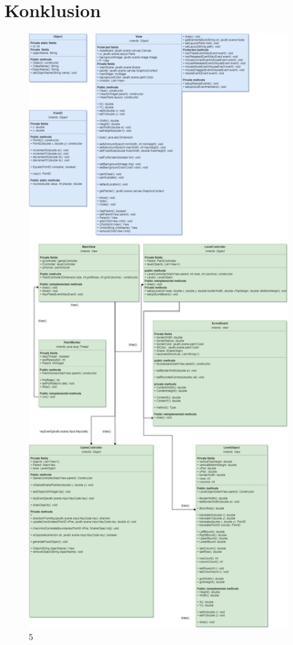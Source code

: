 \documentclass[]{article}
\begin{document}
\section{Konklusion}


\pagebreak
\begin{figure}[h!]
	\centering
	\includegraphics[width=\linewidth]{Structural_diagram.jpg}
	\label{fig:structure}5
\end{figure}
\end{document}
